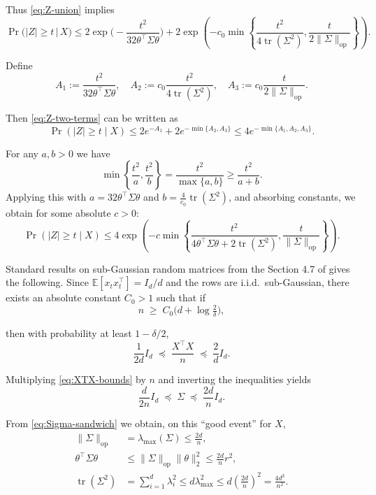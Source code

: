 Thus \eqref{eq:Z-union} implies
\begin{equation}
\Pr\big(|Z|\ge t \,\big|\, X\big)
\le
2\exp\Big(-\frac{t^2}{32\theta^\top\Sigma\theta}\Big)
+
2\exp\left(
  -c_0 \min\left\{
      \frac{t^2}{4\operatorname{tr}(\Sigma^2)},
      \frac{t}{2\|\Sigma\|_{\mathrm{op}}}
  \right\}
\right).
\label{eq:Z-two-terms}
\end{equation}

Define
\[
A_1 := \frac{t^2}{32\theta^\top\Sigma\theta},\quad
A_2 := c_0 \frac{t^2}{4\operatorname{tr}(\Sigma^2)},\quad
A_3 := c_0 \frac{t}{2\|\Sigma\|_{\mathrm{op}}}.
\]

Then \eqref{eq:Z-two-terms} can be written as
\[
\Pr(|Z|\ge t\mid X)
\le 2e^{-A_1} + 2e^{-\min\{A_2,A_3\}}
\le 4e^{-\min\{A_1,A_2,A_3\}}.
\]

For any $a,b>0$ we have
\[
\min\left\{\frac{t^2}{a},\frac{t^2}{b}\right\}
= \frac{t^2}{\max\{a,b\}}
\ge \frac{t^2}{a+b}.
\]
Applying this with $a = 32\theta^\top\Sigma\theta$ and
$b = \frac{4}{c_0}\operatorname{tr}(\Sigma^2)$, and absorbing constants, we obtain
for some absolute $c>0$:
\begin{equation}
\Pr(|Z|\ge t\mid X)
\le 4\exp\left(
  -c \min\left\{
    \frac{t^2}{4\theta^\top\Sigma\theta + 2\operatorname{tr}(\Sigma^2)},
    \frac{t}{\|\Sigma\|_{\mathrm{op}}}
  \right\}
\right).
\label{eq:Z-HW-type}
\end{equation}


Standard results on sub-Gaussian random matrices from the Section 4.7 of \cite{vershynin2018high} gives the following.
Since $\mathbb{E}[x_t x_t^\top] = I_d/d$ and the rows are i.i.d.\ sub-Gaussian, there exists
an absolute constant $C_0>1$ such that if
\begin{equation}
n \;\ge\; C_0\big(d + \log\tfrac{2}{\delta}\big),
\label{eq:n-rm-condition}
\end{equation}

then with probability at least $1-\delta/2$,
\begin{equation}
\frac{1}{2d}I_d
\;\preceq\;
\frac{X^\top X}{n}
\;\preceq\;
\frac{2}{d}I_d.
\label{eq:XTX-bounds}
\end{equation}

Multiplying \eqref{eq:XTX-bounds} by $n$ and inverting the inequalities yields
\begin{equation}
\frac{d}{2n}I_d \;\preceq\; \Sigma \;\preceq\; \frac{2d}{n}I_d.
\label{eq:Sigma-sandwich}
\end{equation}

From \eqref{eq:Sigma-sandwich} we obtain, on this ``good event'' for $X$,
\begin{align}
\|\Sigma\|_{\mathrm{op}}
&= \lambda_{\max}(\Sigma)
 \le \frac{2d}{n},
\label{eq:Sigma-op-bound}
\\
\theta^\top\Sigma\theta
&\le \|\Sigma\|_{\mathrm{op}} \|\theta\|_2^2
 \le \frac{2d}{n} r^2,
\label{eq:theta-Sigma-theta-bound}
\\
\operatorname{tr}(\Sigma^2)
&= \sum_{i=1}^d \lambda_i^2 \le d \lambda_{\max}^2
 \le d\left(\frac{2d}{n}\right)^2
 = \frac{4d^3}{n^2}.
\label{eq:Sigma2-trace-bound}
\end{align}

